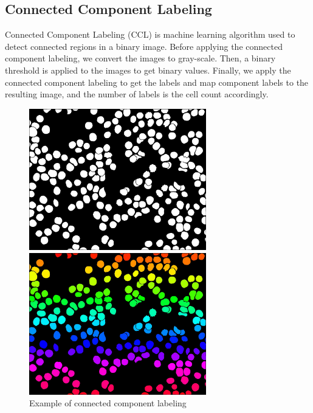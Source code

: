 \subsection{Connected Component Labeling}
\hspace{\parindent}
Connected Component Labeling (CCL) is machine learning algorithm used to detect connected regions in a binary image.
Before applying the connected component labeling, we convert the images to gray-scale. Then, a binary threshold is applied to the images to get binary values.
Finally, we apply the connected component labeling to get the labels and map component labels to the resulting image, and the number of labels is the cell count accordingly.

\begin{figure}[H]
\centering
\begin{minipage}{.5\textwidth}
  \centering
  \centerline{\includegraphics[width = 77mm]{../images/Im0001_1_substraction.jpg}}
\end{minipage}%
\begin{minipage}{.5\textwidth}
  \centering
  \centerline{\includegraphics[width = 77mm]{../images/Im0001_1_connected_compounent_labeling.jpg}}
\end{minipage}
  \caption{Example of connected component labeling}
\end{figure}

